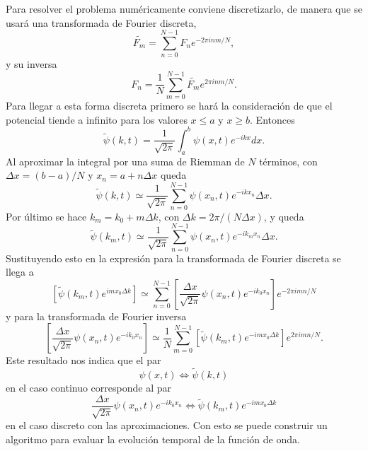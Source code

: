 \documentclass[letterpaper,11pt]{article}
\begin{document}
Para resolver el problema numéricamente conviene discretizarlo, de manera que se usará una transformada de Fourier discreta,
\[
	\widetilde{F_m} = \sum_{n=0}^{N-1} F_n e^{-2\pi i n m / N},
\]
y su inversa
\[
	F_n = \frac{1}{N} \sum_{m=0}^{N-1} \widetilde{F_m} e^{2\pi i n m / N}.
\]
Para llegar a esta forma discreta primero se hará la consideración de que el potencial tiende a infinito para los valores $x \le a$ y $x \ge b$. Entonces
\[
	\widetilde{\psi}(k, t) = \frac{1}{\sqrt{2\pi}}
   \int_a^b \psi(x, t) e^{-ikx} dx.
\]
Al aproximar la integral por una suma de Riemman de $N$ términos, con $\Delta x = (b - a) / N$ y $x_n = a + n\Delta x$ queda
\[
	\widetilde{\psi}(k, t) \simeq \frac{1}{\sqrt{2\pi}}
   \sum_{n=0}^{N-1} \psi(x_n, t) e^{-ikx_n} \Delta x.
\]
Por último se hace $k_m = k_0 + m\Delta k$, con $\Delta k = 2\pi / (N\Delta x)$, y queda
\[
	\widetilde{\psi}(k_m, t) \simeq \frac{1}{\sqrt{2\pi}}
   \sum_{n=0}^{N-1} \psi(x_n, t) e^{-ik_m x_n} \Delta x.
\]
Sustituyendo esto en la expresión para la transformada de Fourier discreta se llega a
\[
	\left[\widetilde{\psi}(k_m, t) e^{i m x_0 \Delta k}\right]
   \simeq \sum_{n=0}^{N-1} 
   \left[ \frac{\Delta x}{\sqrt{2\pi}}
   \psi(x_n, t) e^{-ik_0 x_n} \right]
   e^{-2\pi i m n / N}
\]
y para la transformada de Fourier inversa
\[
	\left[\frac{\Delta x}{\sqrt{2 \pi}} \psi(x_n, t) e^{-i k_0 x_n}\right]
   \simeq \frac{1}{N} \sum_{m=0}^{N-1} 
   \left[\widetilde{\psi}(k_m, t) e^{-i m x_0 \Delta k} \right]
   e^{2\pi i m n / N}.
\]
Este resultado nos indica que el par
\[
	\psi(x, t) \Longleftrightarrow \widetilde{\psi}(k, t)
\]
en el caso continuo corresponde al par
\[
   \frac{\Delta x}{\sqrt{2 \pi}} \psi(x_n, t) e^{-i k_0 x_n}
   \Longleftrightarrow
   \widetilde{\psi}(k_m, t) e^{-i m x_0 \Delta k}
\]
en el caso discreto con las aproximaciones. Con esto se puede construir un algoritmo para evaluar la evolución temporal de la función de onda.
\end{document}
